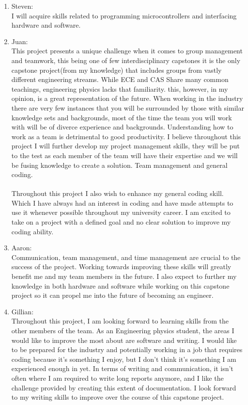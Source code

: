 \documentclass[12pt]{article}
\begin{document}
\begin{enumerate}
  \begin{enumerate}
    \item{Steven:}\\
    I will acquire skills related to programming microcontrollers and interfacing
    hardware and software. \\
    \item{Juan:}\\
    This project presents a unique challenge when it comes to group management and teamwork, this being one of few interdisciplinary capstones it is the only 
    capstone project(from my knowledge) that includes groups from vastly different engineering streams. While ECE and CAS Share many common teachings, engineering physics lacks that familiarity.
    this, however, in my opinion, is a great representation of the future. When working in the industry there are very few instances that you will be surrounded by those with similar knowledge sets 
    and backgrounds, most of the time the team you will work with will be of diverce experience and backgrounds. Understanding how to work as a team is detrimental to good productivity. I believe throughout this 
    project I will further develop my project management skills, they will be put to the test as each member of the team will have their expertise and we will be fusing knowledge to create a solution.
    Team management and general coding.\\
    \\
    Throughout this project I also wish to enhance my general coding skill. Which I have always had an interest in coding and have made attempts to use it whenever possible throughout my university career. I am excited to 
    take on a project with a defined goal and no clear solution to improve my coding ability.
    \item{Aaron:}\\
    Communication, team management, and time management are 
    crucial to the success of the project. Working towards improving these skills will
    greatly benefit me and my team members in the future. I also expect to further my knowledge in
    both hardware and software while working on this capstone project so it 
    can propel me into the future of becoming an engineer.\\
    \item {Gillian:}\\
    Throughout this project, I am looking forward to learning skills from the other members of the team. As an Engineering physics student, the areas I would like to improve the most about are software and writing. I would like to be prepared for the industry and potentially working in a job that requires coding because it’s something I enjoy, but I don’t think it’s something I am experienced enough in yet. 
    \noindent In terms of writing and communication, it isn’t often where I am required to write long reports anymore, and I like the challenge provided by creating this extent of documentation. I look forward to my writing skills to improve over the course of this capstone project. 


\end{enumerate}
\end{enumerate}
\end{document}
